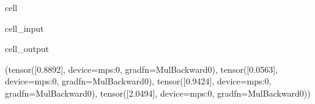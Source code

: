 \documentclass[letterpaper,10pt,english]{jupyterBook}
\begin{document}
\begin{sphinxuseclass}{cell}\begin{sphinxVerbatimInput}

\begin{sphinxuseclass}{cell_input}
\begin{sphinxVerbatim}[commandchars=\\\{\}]
              
              
          
          

   
\end{sphinxVerbatim}

\end{sphinxuseclass}\end{sphinxVerbatimInput}
\begin{sphinxVerbatimOutput}

\begin{sphinxuseclass}{cell_output}
\begin{sphinxVerbatim}[commandchars=\\\{\}]
(tensor([\PYGZhy{}0.8892], device=\PYGZsq{}mps:0\PYGZsq{}, grad\PYGZus{}fn=\PYGZlt{}MulBackward0\PYGZgt{}),
 tensor([\PYGZhy{}0.0563], device=\PYGZsq{}mps:0\PYGZsq{}, grad\PYGZus{}fn=\PYGZlt{}MulBackward0\PYGZgt{}),
 tensor([0.9424], device=\PYGZsq{}mps:0\PYGZsq{}, grad\PYGZus{}fn=\PYGZlt{}MulBackward0\PYGZgt{}),
 tensor([2.0494], device=\PYGZsq{}mps:0\PYGZsq{}, grad\PYGZus{}fn=\PYGZlt{}MulBackward0\PYGZgt{}))
\end{sphinxVerbatim}

\end{sphinxuseclass}\end{sphinxVerbatimOutput}

\end{sphinxuseclass}
\end{document}
